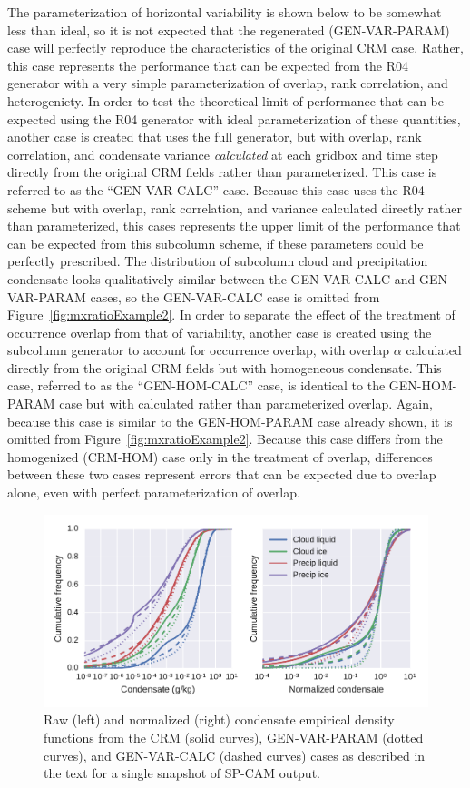 The parameterization of horizontal variability is shown below to be
somewhat less than ideal, so it is not expected that the regenerated
(GEN-VAR-PARAM) case will perfectly reproduce the characteristics of the
original CRM case. Rather, this case represents the performance that can
be expected from the R04 generator with a very simple parameterization
of overlap, rank correlation, and heterogeniety. In order to test the
theoretical limit of performance that can be expected using the R04
generator with ideal parameterization of these quantities, another case
is created that uses the full generator, but with overlap, rank
correlation, and condensate variance \emph{calculated} at each gridbox
and time step directly from the original CRM fields rather than
parameterized. This case is referred to as the ``GEN-VAR-CALC'' case.
Because this case uses the R04 scheme but with overlap, rank
correlation, and variance calculated directly rather than parameterized,
this cases represents the upper limit of the performance that can be
expected from this subcolumn scheme, if these parameters could be
perfectly prescribed. The distribution of subcolumn cloud and
precipitation condensate looks qualitatively similar between the
GEN-VAR-CALC and GEN-VAR-PARAM cases, so the GEN-VAR-CALC case is
omitted from Figure~\ref{fig:mxratioExample2}. In order to separate the
effect of the treatment of occurrence overlap from that of variability,
another case is created using the subcolumn generator to account for
occurrence overlap, with overlap \(\alpha\) calculated directly from the
original CRM fields but with homogeneous condensate. This case, referred
to as the ``GEN-HOM-CALC'' case, is identical to the GEN-HOM-PARAM case
but with calculated rather than parameterized overlap. Again, because
this case is similar to the GEN-HOM-PARAM case already shown, it is
omitted from Figure~\ref{fig:mxratioExample2}. Because this case differs
from the homogenized (CRM-HOM) case only in the treatment of overlap,
differences between these two cases represent errors that can be
expected due to overlap alone, even with perfect parameterization of
overlap.

\begin{figure}[htbp]
\centering
\includegraphics{graphics/subgrid2_mxratio_cdf2.pdf}
\caption{\label{fig:mxratioCDF2}Raw (left) and normalized (right)
condensate empirical density functions from the CRM (solid curves),
GEN-VAR-PARAM (dotted curves), and GEN-VAR-CALC (dashed curves) cases as
described in the text for a single snapshot of SP-CAM
output.}\label{fig:mxratioCDF2}
\end{figure}

